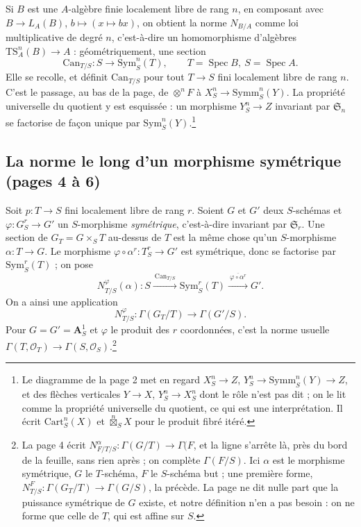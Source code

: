 \documentclass[11pt,a4paper]{article}
\begin{document}
Si $B$ est une $A$-algèbre finie localement libre de rang $n$, en composant
avec $B \to L_A(B)$, $b \mapsto (x \mapsto bx)$, on obtient la norme
$N_{B/A}$ comme loi multiplicative de degré $n$, c'est-à-dire un
homomorphisme d'algèbres $\mathrm{TS}^{n}_{A}(B) \to A$ : géométriquement,
une section
\[
  \mathrm{Can}_{T/S} : S \longrightarrow \mathrm{Sym}^{n}_{S}(T),
  \qquad T = \operatorname{Spec} B,\ S = \operatorname{Spec} A .
\]
Elle se recolle, et définit $\mathrm{Can}_{T/S}$ pour tout $T \to S$ fini
localement libre de rang $n$. C'est le passage, au bas de la page, de
$\otimes^{n} F$ à $X^{n}_{S} \to \mathrm{Symm}^{n}_{S}(Y)$. La propriété
universelle du quotient y est esquissée : un morphisme $Y^{n}_{S} \to Z$
invariant par $\mathfrak{S}_n$ se factorise de façon unique par
$\mathrm{Sym}^{n}_{S}(Y)$.\footnote{Le diagramme de la page 2 met en regard
$X^{n}_{S} \to Z$, $Y^{n}_{S} \to \mathrm{Symm}^{n}_{S}(Y) \to Z$, et des
flèches verticales $Y \to X$, $Y^{n}_{S} \to X^{n}_{S}$ dont le rôle n'est
pas dit ; on le lit comme la propriété universelle du quotient, ce qui est
une interprétation. Il écrit $\mathrm{Cart}^{n}_{S}(X)$ et
$\overset{n}{\boxtimes}_S X$ pour le produit fibré itéré.}

\subsection*{La norme le long d'un morphisme symétrique (pages 4 à 6)}

Soit $p : T \to S$ fini localement libre de rang $r$. Soient $G$ et $G'$
deux $S$-schémas et $\varphi : G^{r}_{S} \to G'$ un $S$-morphisme
\emph{symétrique}, c'est-à-dire invariant par $\mathfrak{S}_r$. Une section
de $G_T = G \times_S T$ au-dessus de $T$ est la même chose qu'un
$S$-morphisme $\alpha : T \to G$. Le morphisme
$\varphi \circ \alpha^{r} : T^{r}_{S} \to G'$ est symétrique, donc se
factorise par $\mathrm{Sym}^{r}_{S}(T)$ ; on pose
\[
  N^{\varphi}_{T/S}(\alpha) : S \xrightarrow{\ \mathrm{Can}_{T/S}\ }
  \mathrm{Sym}^{r}_{S}(T) \xrightarrow{\ \overline{\varphi \circ \alpha^{r}}\ } G' .
\]
On a ainsi une application
\[
  N^{\varphi}_{T/S} : \Gamma(G_T/T) \longrightarrow \Gamma(G'/S).
\]
Pour $G = G' = \mathbf{A}^{1}_{S}$ et $\varphi$ le produit des $r$
coordonnées, c'est la norme usuelle $\Gamma(T, \mathcal{O}_T) \to
\Gamma(S, \mathcal{O}_S)$.\footnote{La page 4 écrit
$N^{\alpha}_{F/T/S} : \Gamma(G/T) \to \Gamma(F$, et la ligne s'arrête là,
près du bord de la feuille, sans rien après ; on complète
$\Gamma(F/S)$. Ici $\alpha$ est le
morphisme symétrique, $G$ le $T$-schéma, $F$ le $S$-schéma but ; une
première forme, $N^{F}_{T/S} : \Gamma(G_T/T) \to \Gamma(G/S)$, la précède.
La page ne dit nulle part que la puissance symétrique de $G$ existe, et notre
définition n'en a pas besoin : on ne forme que celle de $T$, qui est affine
sur $S$.}
\end{document}
